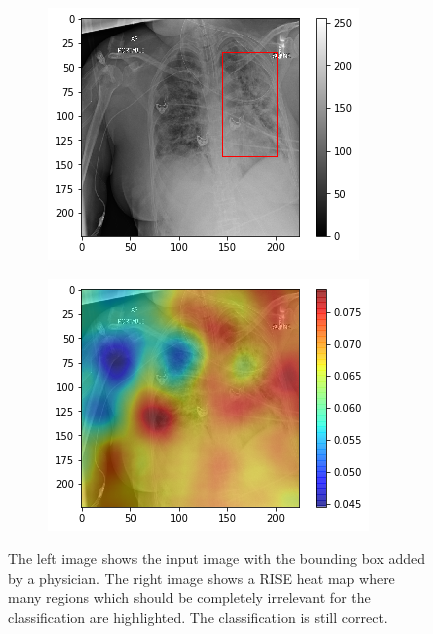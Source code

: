 \begin{figure}[H]
    \centering
    \begin{subfigure}[t]{.4\textwidth}
        \centering
        \includegraphics[width=\linewidth]{chapters/03_classification/images/rise2_bbox.png}
        \caption{}
    \end{subfigure}\hspace{1cm}%
    \begin{subfigure}[t]{.4\textwidth}
        \centering
        \includegraphics[width=\linewidth]{chapters/03_classification/images/rise2_saliency.png}
        \caption{}
    \end{subfigure}
    \caption{The left image shows the input image with the bounding box added by a physician. The right image shows a RISE heat map where many regions which should be completely irrelevant for the classification are highlighted. The classification is still correct.}
    \label{rise_example_3}
\end{figure}



